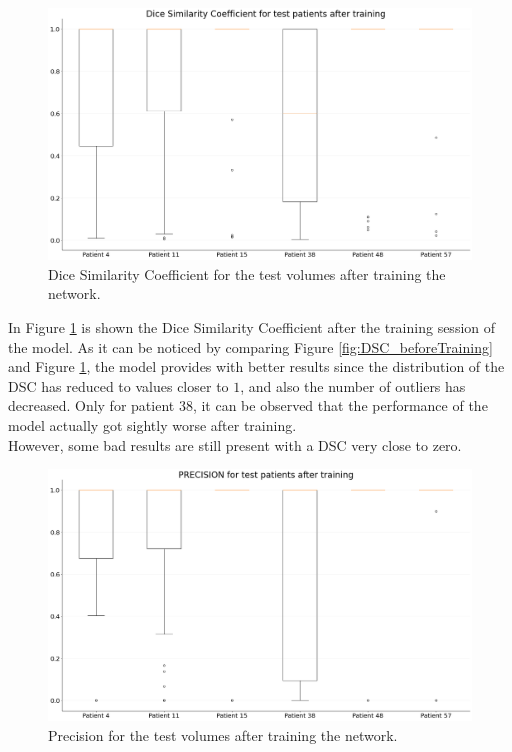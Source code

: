 \documentclass[12pt]{extarticle}
\begin{document}
\begin{figure}[h!]
\centering
\includegraphics[width = \textwidth]{DSC_afterTraining.png}
\caption{Dice Similarity Coefficient for the test volumes after training the network.}
\label{fig:DSC_afterTraining}
\end{figure}
\vspace{6pt}
\noindent In Figure \ref{fig:DSC_afterTraining} is shown the Dice Similarity Coefficient after the training session of the model. As it can be noticed by comparing Figure \ref{fig:DSC_beforeTraining} and Figure \ref{fig:DSC_afterTraining}, the model provides with better results since the distribution of the DSC has reduced to values closer to $1$, and also the number of outliers has decreased. Only for patient 38, it can be observed that the performance of the model actually got sightly  worse after training. \\
However, some bad results are still present with a DSC very close to zero. 

\begin{figure}[h!]
\centering
\includegraphics[width = \textwidth]{PRECISION_afterTraining.png}
\caption{Precision for the test volumes after training the network.}
\label{fig:PRECISION_afterTraining}
\end{figure}
\end{document}
